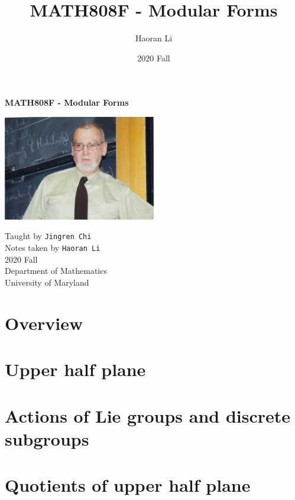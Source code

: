 \documentclass[a4paper,10pt]{article}
\title{MATH808F - Modular Forms}
\author{Haoran Li}
\date{2020 Fall}
\begin{document}
\sloppy %

\begin{titlepage}
\begin{center}
\vspace*{1cm}
\LARGE
\textbf{MATH808F - Modular Forms} \\
\vspace{2cm}
\begin{center}
\includegraphics[width=0.5\textwidth]{Pictures/Langlands.jpg}
\end{center}
\vspace{2cm}
\normalsize
Taught by \texttt{Jingren Chi} \\
Notes taken by \texttt{Haoran Li} \\
2020 Fall \\
\vspace{2cm}
Department of Mathematics\\
University of Maryland\\
\end{center}
\end{titlepage}

\tableofcontents
\newpage

\section{Overview}

\newpage

\section{Upper half plane}

\newpage

\section{Actions of Lie groups and discrete subgroups}

\newpage

\section{Quotients of upper half plane}

\newpage
\end{document}
